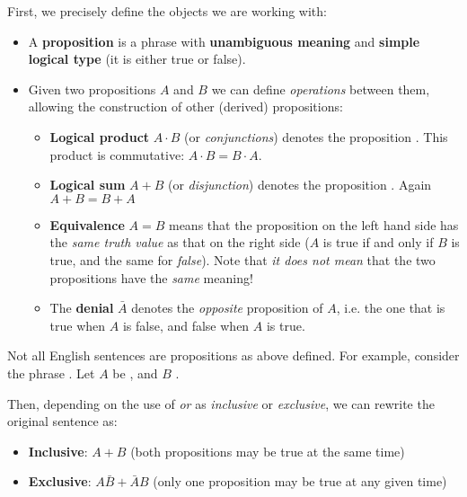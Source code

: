 \documentclass[../template.tex]{subfiles}
\begin{document}
First, we precisely define the objects we are working with:
\begin{itemize}
    \item A \textbf{proposition} is a phrase with \textbf{unambiguous meaning} and \textbf{simple logical type} (it is either true or false).
    \item Given two propositions $A$ and $B$ we can define \textit{operations} between them, allowing the construction of other (derived) propositions:
    \begin{itemize}
        \item \textbf{Logical product} $A \cdot B$ (or \textit{conjunctions}) denotes the proposition . This product is commutative: $A\cdot B = B\cdot A$.
        \item  \textbf{Logical sum} $A + B$ (or \textit{disjunction}) denotes the proposition . Again $A+B=B+A$
        \item \textbf{Equivalence} $A = B$ means that the proposition on the left hand side has the \textit{same truth value} as that on the right side ($A$ is true if and only if $B$ is true, and the same for \textit{false}). Note that \textit{it does not mean} that the two propositions have the \textit{same} meaning!  
        \item The \textbf{denial} $\bar{A}$ denotes the \textit{opposite} proposition of $A$, i.e. the one that is true when $A$ is false, and false when $A$ is true.    
    \end{itemize}
\end{itemize}

\begin{example}
    Not all English sentences are propositions as above defined. For example, consider the phrase . Let $A$ be , and $B$ .

    \medskip

    Then, depending on the use of \textit{or} as \textit{inclusive} or \textit{exclusive}, we can rewrite the original sentence as:
    \begin{itemize}
        \item \textbf{Inclusive}: $A+B$ (both propositions may be true at the same time)
        \item \textbf{Exclusive}: $A\bar{B} + \bar{A}B$  (only one proposition may be true at any given time)
    \end{itemize}
       
\end{example}
\end{document}
